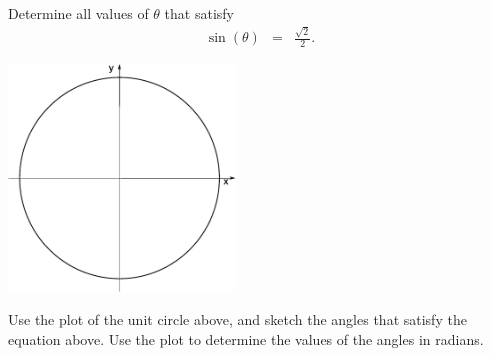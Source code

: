 
\begin{problem}
\item Determine all values of $\theta$ that satisfy 
  \begin{eqnarray*}
    \sin(\theta) & = & \frac{\sqrt{2}}{2}.
  \end{eqnarray*}

  \includegraphics[width=6cm]{trig/img/blankCircle}

  Use the plot of the unit circle above, and sketch the angles that
  satisfy the equation above. Use the plot to determine the values of
  the angles in radians.

  \vfill

\end{problem}


